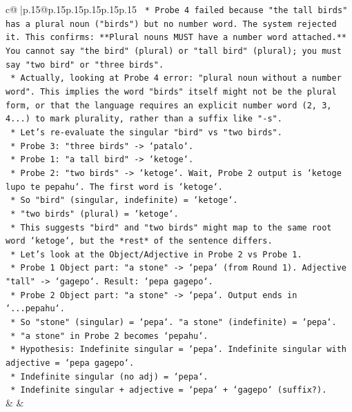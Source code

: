 \documentclass{article}
\begin{document}
{\begin{supertabular}{c@{$\;$}|p{.15\linewidth}@{}p{.15\linewidth}p{.15\linewidth}p{.15\linewidth}p{.15\linewidth}p{.15\linewidth}}
{{{\texttt{        *   Probe 4 failed because "the tall birds" has a plural noun ("birds") but no number word. The system rejected it. This confirms: **Plural nouns MUST have a number word attached.** You cannot say "the bird" (plural) or "tall bird" (plural); you must say "two bird" or "three birds".} \\
\texttt{        *   Actually, looking at Probe 4 error: "plural noun without a number word". This implies the word "birds" itself might not be the plural form, or that the language requires an explicit number word (2, 3, 4...) to mark plurality, rather than a suffix like "{-}s".} \\
\texttt{        *   Let's re{-}evaluate the singular "bird" vs "two birds".} \\
\texttt{        *   Probe 3: "three birds" {-}> `patalo`.} \\
\texttt{        *   Probe 1: "a tall bird" {-}> `ketoge`.} \\
\texttt{        *   Probe 2: "two birds" {-}> `ketoge`. Wait, Probe 2 output is `ketoge lupo te pepahu`. The first word is `ketoge`.} \\
\texttt{        *   So "bird" (singular, indefinite) = `ketoge`.} \\
\texttt{        *   "two birds" (plural) = `ketoge`.} \\
\texttt{        *   This suggests "bird" and "two birds" might map to the same root word `ketoge`, but the *rest* of the sentence differs.} \\
\texttt{        *   Let's look at the Object/Adjective in Probe 2 vs Probe 1.} \\
\texttt{        *   Probe 1 Object part: "a stone" {-}> `pepa` (from Round 1). Adjective "tall" {-}> `gagepo`. Result: `pepa gagepo`.} \\
\texttt{        *   Probe 2 Object part: "a stone" {-}> `pepa`. Output ends in `...pepahu`.} \\
\texttt{        *   So "stone" (singular) = `pepa`. "a stone" (indefinite) = `pepa`.} \\
\texttt{        *   "a stone" in Probe 2 becomes `pepahu`.} \\
\texttt{        *   Hypothesis: Indefinite singular = `pepa`. Indefinite singular with adjective = `pepa gagepo`.} \\
\texttt{        *   Indefinite singular (no adj) = `pepa`.} \\
\texttt{        *   Indefinite singular + adjective = `pepa` + `gagepo` (suffix?).} \\
            }
        }
    }
    & & \\ \\


\end{supertabular}}
\end{document}
